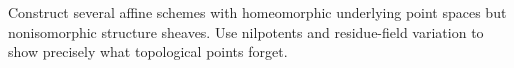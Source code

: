 \begin{problem}\label{chal:vi21-c03}
Construct several affine schemes with homeomorphic underlying point spaces but nonisomorphic structure sheaves.  Use nilpotents and residue-field variation to show precisely what topological points forget.
\end{problem}
